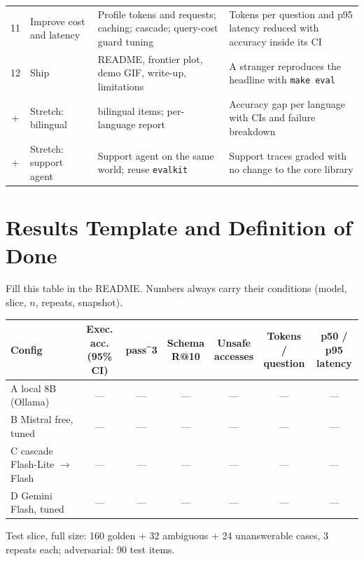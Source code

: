 \documentclass[11pt,a4paper]{article}
\newcommand{\code}[1]{\texttt{\small #1}}
\begin{document}
{\begin{tabular}{@{}c >{\raggedright\arraybackslash}p{2.6cm} >{\raggedright\arraybackslash}p{5.6cm} >{\raggedright\arraybackslash}p{4.6cm}@{}}
11 & Improve cost and latency & Profile tokens and requests; caching; cascade; query-cost guard tuning & Tokens per question and p95 latency reduced with accuracy inside its CI\\
12 & Ship & README, frontier plot, demo GIF, write-up, limitations & A stranger reproduces the headline with \code{make eval}\\
\midrule
\rowcolor{purplelight}+ & Stretch: bilingual & 240 bilingual items; per-language report & Accuracy gap per language with CIs and failure breakdown\\
\rowcolor{purplelight}+ & Stretch: support agent & Support agent on the same world; reuse \code{evalkit} & Support traces graded with no change to the core library\\
\bottomrule
\end{tabular}
}

\section{Results Template and Definition of Done}

Fill this table in the README. Numbers always carry their conditions (model, slice, $n$,
repeats, snapshot).

\begin{center}
\small
\begin{tabular}{@{}l c c c c c c@{}}
\toprule
\textbf{Config} & \makecell{\textbf{Exec. acc.}\\(95\% CI)} & \textbf{pass\^{}3} & \makecell{\textbf{Schema}\\\textbf{R@10}} & \makecell{\textbf{Unsafe}\\\textbf{accesses}} &
\makecell{\textbf{Tokens /}\\\textbf{question}} & \makecell{\textbf{p50 / p95}\\\textbf{latency}}\\
\midrule
A local 8B (Ollama) & --- & --- & --- & --- & --- & ---\\
B Mistral free, tuned & --- & --- & --- & --- & --- & ---\\
C cascade Flash-Lite $\rightarrow$ Flash & --- & --- & --- & --- & --- & ---\\
D Gemini Flash, tuned & --- & --- & --- & --- & --- & ---\\
\bottomrule
\end{tabular}

{\footnotesize\color{grey} Test slice, full size: 160 golden + 32 ambiguous + 24 unanswerable cases,
3 repeats each; adversarial: 90 test items.}
\end{center}
\end{document}

